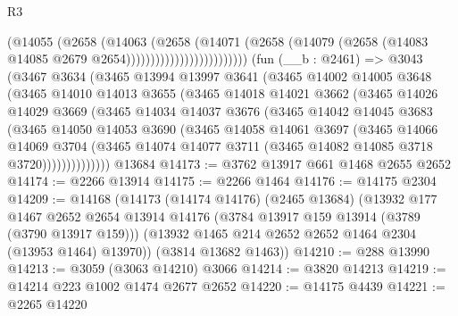 \begin{lexlean}{R3}
\begin{coremodule}
                                    (@14055
                                      (@2658
                                        (@14063
                                          (@2658
                                            (@14071
                                              (@2658
                                                (@14079
                                                  (@2658
                                                    (@14083
                                                      @14085
                                                      @2679
                                                      @2654)))))))))))))))))))))))))
    (fun (__b : @2461) =>
    @3043
      (@3467
        @3634
        (@3465
          @13994
          @13997
          @3641
          (@3465
            @14002
            @14005
            @3648
            (@3465
              @14010
              @14013
              @3655
              (@3465
                @14018
                @14021
                @3662
                (@3465
                  @14026
                  @14029
                  @3669
                  (@3465
                    @14034
                    @14037
                    @3676
                    (@3465
                      @14042
                      @14045
                      @3683
                      (@3465
                        @14050
                        @14053
                        @3690
                        (@3465
                          @14058
                          @14061
                          @3697
                          (@3465
                            @14066
                            @14069
                            @3704
                            (@3465
                              @14074
                              @14077
                              @3711
                              (@3465 @14082 @14085 @3718 @3720))))))))))))))
    @13684
@14173 := @3762 @13917 @661 @1468 @2655 @2652
@14174 := @2266 @13914
@14175 := @2266 @1464
@14176 := @14175 @2304
@14209 := @14168
    (@14173
      (@14174 @14176)
      (@2465 @13684)
      (@13932
        @177
        @1467
        @2652
        @2654
        @13914
        @14176
        (@3784 @13917 @159 @13914 (@3789 (@3790 @13917 @159)))
        (@13932 @1465 @214 @2652 @2652 @1464 @2304 (@13953 @1464) @13970))
      (@3814 @13682 @1463))
@14210 := @288 @13990
@14213 := @3059 (@3063 @14210) @3066
@14214 := @3820 @14213
@14219 := @14214 @223 @1002 @1474 @2677 @2652
@14220 := @14175 @4439
@14221 := @2265 @14220

\end{coremodule}
\end{lexlean}
